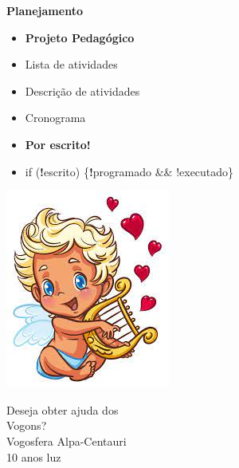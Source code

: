 {\vfill
\pagebreak

\LARGE   
\textbf{Planejamento}


	\begin{itemize}
		\Large
		\item \textbf{Projeto Pedagógico}	
		\item Lista de atividades
		\item Descrição de atividades
		\item Cronograma	
		\item \textbf{Por escrito!}
		\item if (\textbf{!}escrito)
		\subitem \{\textbf{!}programado \&\& {!}executado\}
	\end{itemize}

	\vfill	
\pagebreak

\begin{center}
	\includegraphics[height=.7\textheight]{./IMG-GIT/anjo.jpg}
	
	
\end{center}
\vfill
\pagebreak

\begin{multicols}{2}
		
	\begin{flushright}
			{
	\LARGE
	Deseja obter ajuda dos \\Vogons?\\
	{\LARGE Vogosfera Alpa-Centauri\\10 anos luz}
}
	

\end{flushright}
\end{multicols}}
